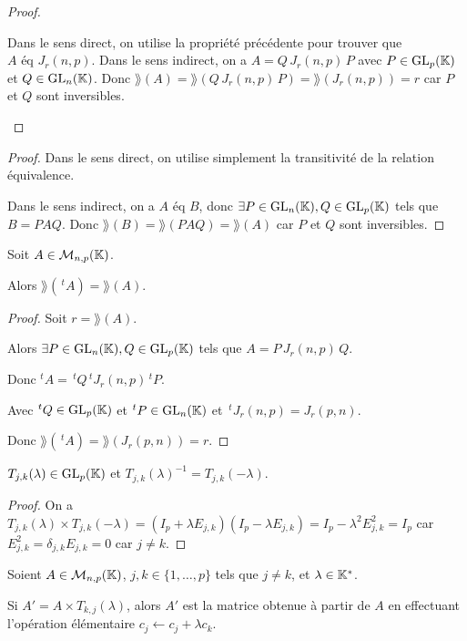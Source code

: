 \documentclass[12pt,a4paper]{report}
\begin{document}
\begin{proof}
    \begin{outline}
        \1 Dans le sens direct, on utilise la propriété précédente pour trouver que $A \text{ éq } J_r(n,p)$.
        \1 Dans le sens indirect, on a $A = Q\,J_r(n,p)\,P$ avec $P \in \mathrm{GL}_p(\mathbb{K})$ et $Q \in \mathrm{GL}_n(\mathbb{K})$. Donc $\rang(A) = \rang(Q\,J_r(n,p)\,P) = \rang(J_r(n,p)) = r$ car $P$ et $Q$ sont inversibles.
    \end{outline}
\end{proof}

\begin{proof}
    Dans le sens direct, on utilise simplement la transitivité de la relation équivalence.

    Dans le sens indirect, on a $A \text{ éq } B$, donc $\exists P \in \mathrm{GL}_n(\mathbb{K}), Q \in \mathrm{GL}_p(\mathbb{K})$ tels que $B = PAQ$. Donc $\rang(B) = \rang(PAQ) = \rang(A)$ car $P$ et $Q$ sont inversibles.
\end{proof}

\begin{property}
    Soit $A \in \mathcal M_{n,p}(\mathbb{K})$.

    Alors $\rang(\,^tA) = \rang(A)$.
\end{property}

\begin{proof}
    Soit $r = \rang(A)$.

    Alors $\exists P \in \mathrm{GL}_n(\mathbb{K}), Q \in \mathrm{GL}_p(\mathbb{K})$ tels que $A = P\,J_r(n,p)\,Q$.

    Donc $^tA = \,{^tQ}\,{^tJ_r(n,p)}\,{^tP}$.

    Avec $^tQ \in \mathrm{GL}_p(\mathbb{K})$ et $^tP \in \mathrm{GL}_n(\mathbb{K})$ et $\,^tJ_r(n,p) = J_r(p,n)$.

    Donc $\rang(\,^tA) = \rang(J_r(p,n)) = r$.
\end{proof}

\begin{property}
    $T_{j,k}(\lambda) \in \mathrm{GL}_p(\mathbb{K})$ et $T_{j,k}(\lambda)^{-1} = T_{j,k}(-\lambda)$.
\end{property}

\begin{proof}
    On a $T_{j,k}(\lambda) \times T_{j,k}(-\lambda) = (I_p + \lambda E_{j,k})(I_p - \lambda E_{j,k}) = I_p - \lambda^2 E_{j,k}^2 = I_p$ car $E_{j,k}^2 = \delta_{j,k}E_{j,k} = 0$ car $j \ne k$.
\end{proof}

\begin{property}
    Soient $A \in \mathcal M_{n,p}(\mathbb{K})$, $j,k \in \{1,\dots,p\}$ tels que $j \ne k$, et $\lambda \in \mathbb{K}^*$.

    Si $A' = A \times T_{k,j}(\lambda)$, alors $A'$ est la matrice obtenue à partir de $A$ en effectuant l'opération élémentaire $c_j \leftarrow c_j + \lambda c_k$.
\end{property}
\end{document}
